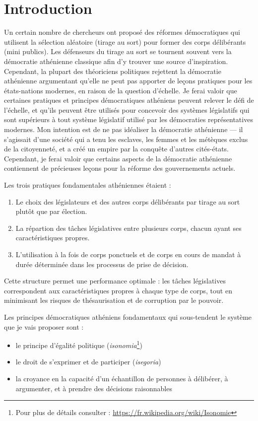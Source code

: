 \section*{Introduction}

Un certain nombre de chercheurs ont proposé des réformes démocratiques
qui utilisent la sélection aléatoire (tirage au sort) pour former des
corps délibérants (mini publics). Les défenseurs du tirage au sort
se tournent souvent vers la démocratie athénienne classique afin d'y
trouver une source d’inspiration. Cependant, la plupart des théoriciens
politiques rejettent la démocratie athénienne argumentant qu’elle ne
peut pas apporter de leçons pratiques pour les états-nations modernes,
en raison de la question d’échelle. Je ferai valoir que certaines
pratiques et principes démocratiques athéniens peuvent relever le défi
de l'échelle, et qu'ils peuvent être utilisés pour concevoir des
systèmes législatifs qui sont supérieurs à tout système législatif
utilisé par les démocraties représentatives modernes. Mon intention
est de ne pas idéaliser la démocratie athénienne --- il s'agissait d'une
société qui a tenu les esclaves, les femmes et les métèques exclus de
la citoyenneté, et a créé un empire par la conquête d'autres
cités-états. Cependant, je ferai valoir que certains aspects de la
démocratie athénienne contiennent de précieuses leçons pour la réforme
des gouvernements actuels.\par
Les trois pratiques fondamentales athéniennes étaient : 
\begin{enumerate}
\item Le choix des législateurs et des autres corps délibérants par tirage
au sort plutôt que par élection.
\item La répartion des tâches législatives entre plusieurs corps, chacun
ayant ses caractéristiques propres.
\item L'utilisation à la fois de corps ponctuels et de corps en 
cours de mandat à durée déterminée dans les processus de prise de décision.
\end{enumerate}
Cette structure permet une performance optimale : les tâches
législatives correspondent aux caractéristiques propres à chaque type
de corps, tout en minimisant les risques de thésaurisation et de
corruption par le pouvoir.\par  
Les principes démocratiques athéniens fondamentaux qui sous-tendent le
système que je vais proposer sont :
\begin{itemize}
\item le principe d'égalité politique (\emph{isonomia}\footnote{Pour
    plus de détails consulter : \url{https://fr.wikipedia.org/wiki/Isonomie}})
\item le droit de s'exprimer et de participer (\emph{isegoria})
\item la croyance en la capacité d'un échantillon de personnes à
délibérer, à argumenter, et à prendre des décisions raisonnables
\end{itemize}

